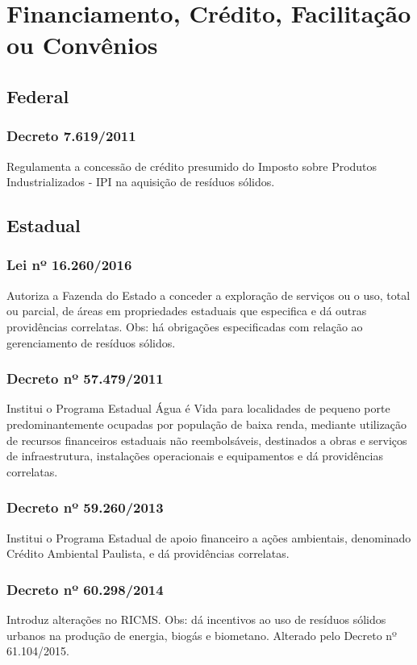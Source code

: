 \section{Financiamento, Crédito, Facilitação ou Convênios}
\begin{subapend}
	\subsection{Federal}
	\begin{subsubapend}
		\item \subsubsection{Decreto 7.619/2011}
		Regulamenta a concessão de crédito presumido do Imposto sobre Produtos Industrializados - IPI na aquisição de resíduos sólidos.
	\end{subsubapend}
\end{subapend}

 \begin{subapend}
 	\subsection{Estadual}
 	\begin{subsubapend}
 		\item \subsubsection{Lei nº 16.260/2016}
 		Autoriza a Fazenda do Estado a conceder a exploração de serviços ou o uso, total ou parcial, de áreas em propriedades estaduais que especifica e dá outras providências correlatas. Obs: há obrigações especificadas com relação ao gerenciamento de resíduos sólidos.
 		\subsubsection{Decreto nº 57.479/2011}
 		Institui o Programa Estadual Água é Vida para localidades de pequeno porte predominantemente ocupadas por população de baixa renda, mediante utilização de recursos financeiros estaduais não reembolsáveis, destinados a obras e serviços de infraestrutura, instalações operacionais e equipamentos e dá providências correlatas.
 		\subsubsection{Decreto nº 59.260/2013}
 		Institui o Programa Estadual de apoio financeiro a ações ambientais, denominado Crédito Ambiental Paulista, e dá providências correlatas.
 		\subsubsection{Decreto nº 60.298/2014}
 		Introduz alterações no RICMS. Obs: dá incentivos ao uso de resíduos sólidos urbanos na produção de energia, biogás e biometano. Alterado pelo Decreto nº 61.104/2015.
 	\end{subsubapend}
 \end{subapend}
 

